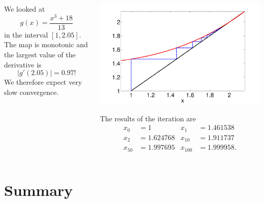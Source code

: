 \documentclass{beamer}
\begin{document}
\begin{frame}
\begin{overlayarea}{\textwidth}{\textheight}
{    }
    {
  \begin{columns}
    \begin{column}{0.475\textwidth}
      We looked at
      \begin{equation*}
        g(x)  = \frac{x^3 + 18}{13}
      \end{equation*}
      in the interval $[1, 2.05]$. The map is monotonic and the
      largest value of the derivative is
      \begin{equation*}
        |g'(2.05)| = 0.97!
      \end{equation*}
      We therefore expect very slow convergence.
    \end{column}
    \begin{column}{0.525\textwidth}
      \begin{center}
        \includegraphics[width=\textwidth]{figures/poly_plotmap_final}
      \end{center}
      The results of the iteration are
      \begin{align*}
        x_0 & = 1 &
        x_1 & = 1.461538 \\
        x_2 & = 1.624768 &
        x_{10} & = 1.911737 \\
        x_{50} & = 1.997695 &
        x_{100} & = 1.999958.
      \end{align*}
    \end{column}
  \end{columns}
    }
  \end{overlayarea}

\end{frame}

\section{Summary}
\end{document}
